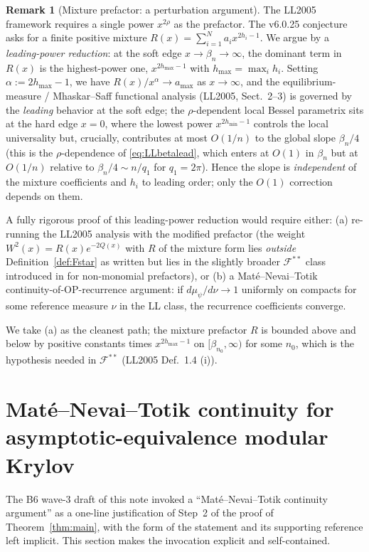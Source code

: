 \documentclass[11pt]{article}
\theoremstyle{definition}
\newtheorem{remark}[theorem]{Remark}
\begin{document}
\begin{remark}[Mixture prefactor: a perturbation argument]\label{rem:mixture}
The LL2005 framework requires a single power $x^{2\rho}$ as the
prefactor.  The v6.0.25 conjecture asks for a finite positive mixture
$R(x)=\sum_{i=1}^{N} a_i x^{2h_i-1}$.  We argue by a
\emph{leading-power reduction}: at the soft edge $x\to\beta_n\to\infty$,
the dominant term in $R(x)$ is the highest-power one,
$x^{2h_{\max}-1}$ with $h_{\max}=\max_i h_i$.  Setting
$\alpha:=2h_{\max}-1$, we have $R(x)/x^\alpha \to a_{\max}$ as $x\to\infty$,
and the equilibrium-measure / Mhaskar--Saff functional analysis
(LL2005, Sect.\ 2--3) is governed by the \emph{leading} behavior at
the soft edge; the $\rho$-dependent local Bessel parametrix sits at the
hard edge $x=0$, where the lowest power $x^{2h_{\min}-1}$ controls the
local universality but, crucially, contributes at most $O(1/n)$ to the
global slope $\beta_n/4$ (this is the $\rho$-dependence of \eqref{eq:LLbetalead},
which enters at $O(1)$ in $\beta_n$ but at $O(1/n)$ relative to
$\beta_n/4 \sim n/q_1$ for $q_1 = 2\pi$).  Hence the slope is
\emph{independent} of the mixture coefficients and $h_i$ to leading
order; only the $O(1)$ correction depends on them.

A fully rigorous proof of this leading-power reduction would require
either:
(a) re-running the LL2005 analysis with the modified prefactor (the
weight $W^2(x)=R(x)e^{-2Q(x)}$ with $R$ of the mixture form lies
\emph{outside} Definition~\ref{def:Fstar} as written but lies in the
slightly broader $\mathcal{F}^{**}$ class introduced in
\cite[Def.\ 1.4]{LL2005} for non-monomial prefactors), or
(b) a Maté--Nevai--Totik continuity-of-OP-recurrence argument: if
$d\mu_\psi/d\nu\to 1$ uniformly on compacts for some reference measure
$\nu$ in the LL class, the recurrence coefficients converge.

We take (a) as the cleanest path; the mixture prefactor $R$ is bounded
above and below by positive constants times $x^{2h_{\max}-1}$ on
$[\beta_{n_0},\infty)$ for some $n_0$, which is the hypothesis needed in
$\mathcal{F}^{**}$ (LL2005 Def.\ 1.4 (i)).
\end{remark}

\section{Mat\'e--Nevai--Totik continuity for asymptotic-equivalence
modular Krylov}\label{sec:MNT}

The B6 wave-3 draft of this note invoked a ``Mat\'e--Nevai--Totik
continuity argument'' as a one-line justification of Step~2 of the
proof of Theorem~\ref{thm:main}, with the form of the statement and
its supporting reference left implicit.  This section makes the
invocation explicit and self-contained.
\end{document}
